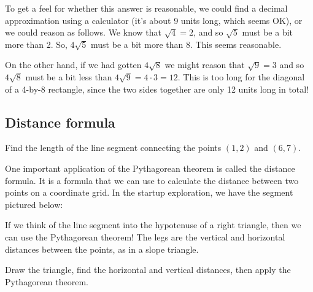 To get a feel for whether this answer is reasonable, we could find a decimal approximation using a calculator (it's about 9 units long, which seems OK), or we could reason as follows. We know that $\sqrt{4} = 2$, and so $\sqrt{5}$ must be a bit more than 2. So, $4\sqrt{5}$ must be a bit more than 8. This seems reasonable.

On the other hand, if we had gotten $4\sqrt{8}$ we might reason that $\sqrt{9} = 3$ and so $4\sqrt{8}$ must be a bit less than $4\sqrt{9} = 4\cdot3 = 12$. This is too long for the diagonal of a 4-by-8 rectangle, since the two sides together are only 12 units long in total!

\subsection{Distance formula}

\begin{boxedexplore}
Find the length of the line segment connecting the points $(1,2)$ and $(6,7)$.
\end{boxedexplore}

One important application of the Pythagorean theorem is called the \gls{distance formula}. It is a formula that we can use to calculate the distance between two points on a coordinate grid. In the startup exploration, we have the segment pictured below:

\begin{center}
\end{center}

If we think of the line segment into the hypotenuse of a right triangle, then we can use the Pythagorean theorem! The legs are the vertical and horizontal distances between the points, as in a slope triangle.

Draw the triangle, find the horizontal and vertical distances, then apply the Pythagorean theorem.

